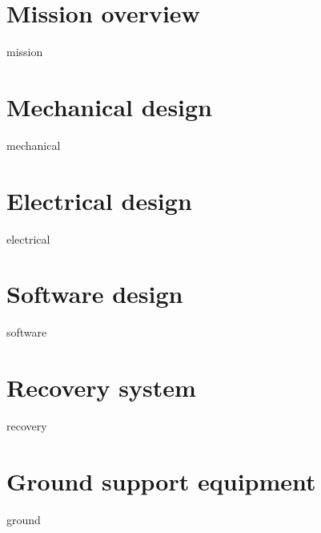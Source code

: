 \documentclass[class=report, crop=false]{standalone}
\begin{document}
\section{Mission overview}
{mission}
\section{Mechanical design}
{mechanical}
\section{Electrical design}
{electrical}
\section{Software design}
{software}
\section{Recovery system}
{recovery}
\section{Ground support equipment}
{ground}
\end{document}

